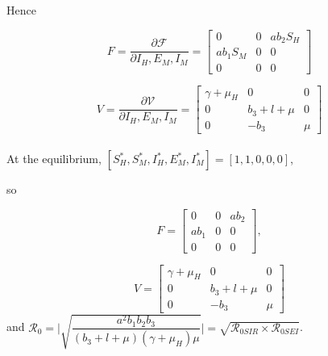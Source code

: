 \documentclass[a4paper,fleqn]{cas-dc}
\begin{document}
\begin{itemize}
Hence

$$ F = \dfrac{\partial{\mathcal F}}{\partial I_H, E_M, I_M} =
\begin{bmatrix}
0 & 0 & ab_2 S_H\\
ab_1 S_M & 0 & 0\\
0 & 0 & 0
\end{bmatrix}$$

$$ V = \dfrac{\partial{\mathcal V}}{\partial I_H, E_M, I_M} =%
\begin{bmatrix}
\gamma + \mu_H & 0 & 0\\
0 & b_3+l+\mu & 0\\
0 & -b_3 & \mu
\end{bmatrix}$$
\\At the equilibrium, $[S_H^*, S_M^*, I_H^*, E_M^*, I_M^*] = [1,1,0,0,0]$, 

so 

$$F=\begin{bmatrix}
0 & 0 & ab_2\\
ab_1 & 0 & 0\\
0 & 0 & 0
\end{bmatrix},$$

$$V = \begin{bmatrix}
\gamma + \mu_H & 0 & 0\\
0 & b_3+l+\mu & 0\\
0 & -b_3 & \mu
\end{bmatrix}$$ 
and $\mathcal{R}_0 = \Big | \sqrt{\dfrac{a^2 b_1 b_2 b_3}{(b_3 + l + \mu)(\gamma+\mu_H) \mu}}\Big | = 
\sqrt{\mathcal{R}_{0 SIR} \times \mathcal{R}_{0 SEI}}$. 
\end{itemize}
\end{document}
